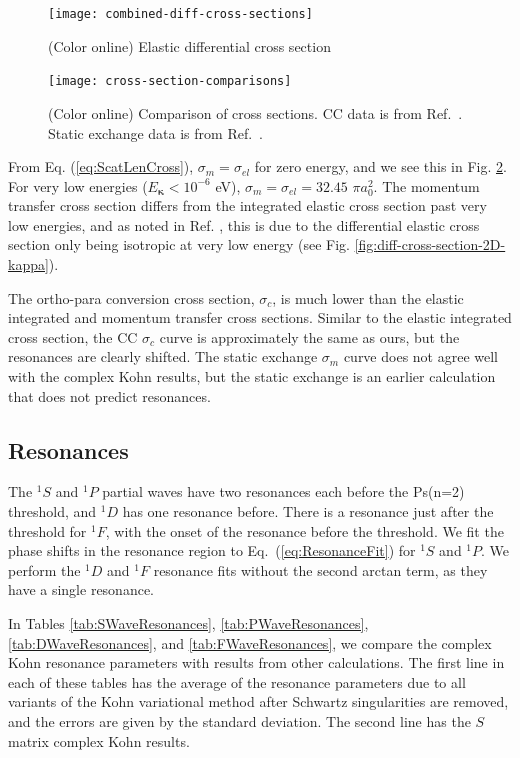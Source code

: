 \documentclass[preprint,showpacs,showkeys,preprintnumbers,amsmath,amssymb,longbibliography,pra,aps]{revtex4-1}
\begin{document}
\begin{figure}[H]
	\centering
	\texttt{[image: combined-diff-cross-sections]}
	\caption{(Color online) Elastic differential cross section}
	\label{fig:combined-diff-cross-sections}
\end{figure}

\begin{figure}[H]
	\centering
	\texttt{[image: cross-section-comparisons]}
	\caption{(Color online) Comparison of cross sections. CC data is from
Ref.~\cite{Blackwood2002}. Static exchange data is from Ref.~\cite{Hara1975}.}
	\label{fig:cross-section-comparisons}
\end{figure}

From Eq. (\ref{eq:ScatLenCross}), $\sigma_m = \sigma_{el}$ for zero energy, 
and we see this in Fig. \ref{fig:cross-section-comparisons}. For very low 
energies ($E_{\bm \kappa} < 10^{-6}$ eV),
$\sigma_m = \sigma_{el} = 32.45$ $\pi a_0^2$.
The momentum transfer cross section differs from the integrated elastic cross
section past very low energies, and as 
noted in Ref. \cite{Blackwood2002c}, this is due to the differential elastic 
cross section only being isotropic at very low energy
(see Fig. \ref{fig:diff-cross-section-2D-kappa}).

The ortho-para conversion cross section, $\sigma_c$, is much lower than the 
elastic integrated and momentum transfer cross sections. Similar to the 
elastic integrated cross section, the CC $\sigma_c$ curve \cite{Blackwood2002}
is approximately the same as ours, but the resonances are clearly shifted. 
The static exchange $\sigma_m$ curve \cite{Hara1975} does not agree well with 
the complex Kohn results, but the static exchange is an earlier calculation 
that does not predict resonances.

\subsection{Resonances}
\label{sec:Resonances}
The $^1S$ and $^1P$ partial waves have two resonances each before the Ps(n=2) 
threshold, and $^1D$ has one resonance before. There is a resonance just 
after the threshold for $^1F$, with the onset of the resonance before the 
threshold. We fit the phase shifts in the resonance region to
Eq.~(\ref{eq:ResonanceFit}) for $^1S$ and $^1P$. We perform the $^1D$ and $^1F$
resonance fits without the second arctan term, as they have a single resonance.

In Tables \ref{tab:SWaveResonances}, \ref{tab:PWaveResonances},
\ref{tab:DWaveResonances}, and \ref{tab:FWaveResonances},
we compare the complex Kohn resonance parameters with results from other
calculations. The first line in each of these tables has the average of the
resonance parameters due to all variants of the Kohn variational method after
Schwartz singularities are removed, and the errors are given by the standard 
deviation. The second line has the $S$ matrix complex Kohn results.
\end{document}
